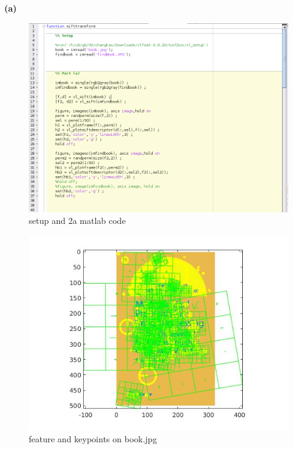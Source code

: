 \documentclass[]{article}
\begin{document}
\section{}
\textbf{(a)}

\begin{figure}[h!]
\centering
\includegraphics[width=1.35\textwidth]{img/2a1-code.png}
\caption{setup and 2a matlab code}
\end{figure}
\begin{figure}[h!]
\centering
\includegraphics[width=1.35\textwidth]{img/2a1.jpg}
\caption{feature and keypoints on book.jpg}
\end{figure}
\end{document}
